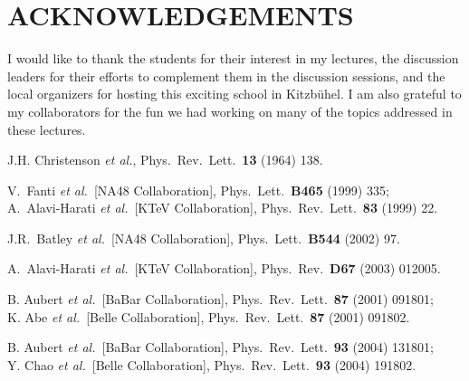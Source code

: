 \documentclass[12pt]{article}
\begin{document}
\vskip1cm
\noindent

\section*{ACKNOWLEDGEMENTS}

I would like to thank the students for their interest in my lectures,
the discussion leaders for their efforts to complement them in the
discussion sessions, and the local organizers for hosting this exciting
school in Kitzb\"uhel. I am also grateful to my collaborators for the fun 
we had working on many of the topics addressed in these lectures.



\begin{thebibliography}{999}


J.H. Christenson {\it et al.}, 
{Phys.\ Rev.\ Lett.}~{\bf 13} (1964) 138.

V.~Fanti {\it et al.}\  [NA48 Collaboration],
{ Phys.\ Lett.}~{\bf B465} (1999) 335;\\
A.~Alavi-Harati {\it et al.}\  [KTeV Collaboration],
{ Phys.\ Rev.\ Lett.}~{\bf 83} (1999) 22.

J.R.~Batley {\it et al.}\  [NA48 Collaboration],
{ Phys.\ Lett.}~{\bf B544} (2002) 97.

A.~Alavi-Harati {\it et al.}\  [KTeV Collaboration],
{ Phys.\ Rev.}~{\bf D67} (2003) 012005.

B. Aubert {\it et al.}\ [BaBar Collaboration],
{ Phys.\ Rev.\ Lett.}~{\bf 87} (2001) 091801;\\
K. Abe {\it et al.}\ [Belle Collaboration],
{ Phys.\ Rev.\ Lett.}~{\bf 87} (2001) 091802.

B. Aubert {\it et al.}\ [BaBar Collaboration],
  { Phys.\ Rev.\ Lett.}~{\bf 93} (2004) 131801;\\
  Y. Chao {\it et al.}\  [Belle Collaboration],
  { Phys.\ Rev.\ Lett.}~{\bf 93} (2004) 191802.


\end{thebibliography}
\end{document}
